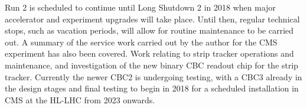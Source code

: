 Run 2 is scheduled to continue until Long Shutdown 2 in 2018 when major accelerator and experiment upgrades
will take place. Until then, regular technical stops, such as vacation periods, will allow for routine
maintenance to be carried out. A summary of the service work carried out by the author for the CMS experiment
has also been covered. Work relating to strip tracker operations and maintenance, and investigation of the new
binary CBC readout chip for the strip tracker. Currently the newer CBC2 is undergoing testing, with a CBC3
already in the design stages and final testing to begin in 2018 for a scheduled installation in CMS at the
HL-LHC from 2023 onwards.
